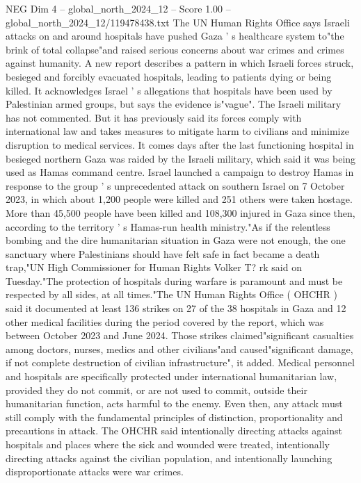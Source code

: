 \begin{textsample}{NEG Dim 4 – global\_north\_2024\_12 – Score 1.00 – global\_north\_2024\_12/119478438.txt}  \label{ex:f4_neg_152}
The UN Human Rights Office says Israeli attacks on and around hospitals have pushed Gaza ' s healthcare system to"the brink of total collapse"and raised serious concerns about war crimes and crimes against humanity.
A new report describes a pattern in which Israeli forces struck, besieged and forcibly evacuated hospitals, leading to patients dying or being killed.
It acknowledges Israel ' s allegations that hospitals have been used by Palestinian armed groups, but says the evidence is"vague".
The Israeli military has not commented.
But it has previously said its forces comply with international law and takes measures to mitigate harm to civilians and minimize disruption to medical services.
It comes days after the last functioning hospital in besieged northern Gaza was raided by the Israeli military, which said it was being used as Hamas command centre.
Israel launched a campaign to destroy Hamas in response to the group ' s unprecedented attack on southern Israel on 7 October 2023, in which about 1,200 people were killed and 251 others were taken hostage.
More than 45,500 people have been killed and 108,300 injured in Gaza since then, according to the territory ' s Hamas-run health ministry."As if the relentless bombing and the dire humanitarian situation in Gaza were not enough, the one sanctuary where Palestinians should have felt safe in fact became a death trap,"UN High Commissioner for Human Rights Volker T? rk said on Tuesday."The protection of hospitals during warfare is paramount and must be respected by all sides, at all times."The UN Human Rights Office ( OHCHR ) said it documented at least 136 strikes on 27 of the 38 hospitals in Gaza and 12 other medical facilities during the period covered by the report, which was between October 2023 and June 2024.
Those strikes claimed"significant casualties among doctors, nurses, medics and other civilians"and caused"significant damage, if not complete destruction of civilian infrastructure", it added.
Medical personnel and hospitals are specifically protected under international humanitarian law, provided they do not commit, or are not used to commit, outside their humanitarian function, acts harmful to the enemy.
Even then, any attack must still comply with the fundamental principles of distinction, proportionality and precautions in attack.
The OHCHR said intentionally directing attacks against hospitals and places where the sick and wounded were treated, intentionally directing attacks against the civilian population, and intentionally launching disproportionate attacks were war crimes.

\end{textsample}
